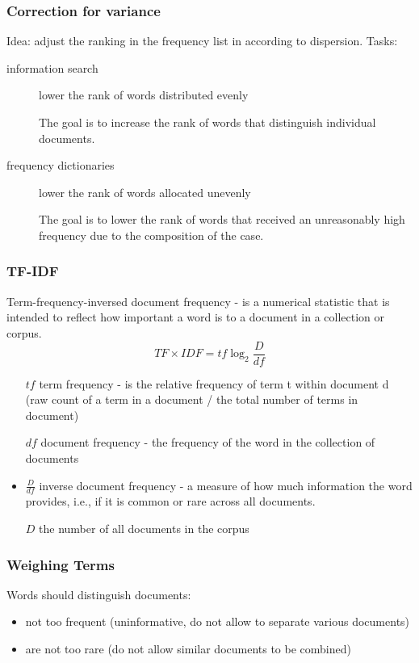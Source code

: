 \documentclass[svgnames]{beamer}
\begin{document}
\begin{frame}
  \frametitle{Correction for variance}
  Idea: adjust the ranking in the frequency list in
  according to dispersion. Tasks:
  \begin{description}
  \item[information search] lower the rank of words distributed  evenly

    The goal is to increase the rank of words that distinguish individual documents.

  \item[frequency dictionaries] lower the rank of words allocated unevenly

    The goal is to lower the rank of words that received an unreasonably high
    frequency due to the composition of the case.
  \end{description}
\end{frame}

\begin{frame}
  \frametitle{TF-IDF}
  Term-frequency-inversed document frequency - is a numerical statistic that is intended to reflect how important a word is to a document in a collection or corpus.
  \begin{equation}
    TF \times IDF = tf\log_2\frac{D}{df}
  \end{equation}
  \begin{itemize}
  \item[$tf$]  term frequency - is the relative frequency of term t within document d (raw count of a term in a document / the total number of terms in document)
  \item[$df$] document frequency - the frequency of the word in the collection of documents
  \item $\frac{D}{df}$ inverse document frequency - a measure of how much information the word provides, i.e., if it is common or rare across all documents.
  \item[$D$] the number of all documents in the corpus
  \end{itemize}
\end{frame}


\begin{frame}
  \frametitle{Weighing Terms}
  Words should \alert{distinguish} documents:
  \begin{itemize}
  \item not too frequent (uninformative, do not allow to separate
    various documents)
  \item are not too rare (do not allow similar documents to be combined)
  \end{itemize}
\end{frame}
\end{document}
